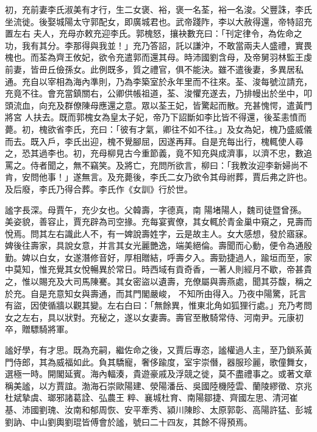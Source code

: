 \begin{pinyinscope}
 初，充前妻李氏淑美有才行，生二女褒、裕，褒一名荃，裕一名浚。父豐誅，李氏坐流徙。後娶城陽太守郭配女，即廣城君也。武帝踐阼，李以大赦得還，帝特詔充置左右
 夫人，充母亦敕充迎李氏。郭槐怒，攘袂數充曰：「刊定律令，為佐命之功，我有其分。李那得與我並！」充乃答詔，託以謙沖，不敢當兩夫人盛禮，實畏槐也。而荃為齊王攸妃，欲令充遣郭而還其母。時沛國劉含母，及帝舅羽林監王虔前妻，皆毌丘儉孫女。此例既多，質之禮官，俱不能決。雖不遣後妻，多異居私通。充自以宰相為海內準則，乃為李築室於永年里而不往來。荃、浚每號泣請充，充竟不往。會充當鎮關右，公卿供帳祖道，荃、浚懼充遂去，乃排幔出於坐中，叩頭流血，向充及群僚陳母應還之意。眾以荃王妃，皆驚起而散。充甚愧愕，遣黃門將宮
 人扶去。既而郭槐女為皇太子妃，帝乃下詔斷如李比皆不得還，後荃恚憤而薨。初，槐欲省李氏，充曰：「彼有才氣，卿往不如不往。」及女為妃，槐乃盛威儀而去。既入戶，李氏出迎，槐不覺腳屈，因遂再拜。自是充每出行，槐輒使人尋之，恐其過李也。初，充母柳見古今重節義，竟不知充與成濟事，以濟不忠，數追罵之。侍者聞之，無不竊笑。及將亡，充問所欲言，柳曰：「我教汝迎李新婦尚不肯，安問他事！」遂無言。及充薨後，李氏二女乃欲令其母祔葬，賈后弗之許也。及后廢，李氏乃得合葬。李氏作《女訓》行於世。



 謐字長深。母賈午，充少女也。父韓壽，字德真，南
 陽堵陽人，魏司徒暨曾孫。美姿貌，善容止，賈充辟為司空掾。充每宴賓僚，其女輒於青金巢中窺之，見壽而悅焉。問其左右識此人不，有一婢說壽姓字，云是故主人。女大感想，發於寤寐。婢後往壽家，具說女意，并言其女光麗艷逸，端美絕倫。壽聞而心動，便令為通殷勤。婢以白女，女遂潛修音好，厚相贈結，呼壽夕入。壽勁捷過人，踰垣而至，家中莫知，惟充覺其女悅暢異於常日。時西域有貢奇香，一著人則經月不歇，帝甚貴之，惟以賜充及大司馬陳騫。其女密盜以遺壽，充僚屬與壽燕處，聞其芬馥，稱之於充。自是充意知女與壽通，而其門閣嚴峻，
 不知所由得入。乃夜中陽驚，託言有盜，因使循牆以觀其變。左右白曰：「無餘異，惟東北角如狐狸行處。」充乃考問女之左右，具以狀對。充秘之，遂以女妻壽。壽官至散騎常侍、河南尹。元康初卒，贈驃騎將軍。



 謐好學，有才思。既為充嗣，繼佐命之後，又賈后專恣，謐權過人主，至乃鎖系黃門侍郎，其為威福如此。負其驕寵，奢侈踰度，室宇崇僭，器服珍麗，歌僮舞女，選極一時。開閣延賓。海內輻湊，貴遊豪戚及浮競之徙，莫不盡禮事之。或著文章稱美謐，以方賈誼。渤海石崇歐陽建、滎陽潘岳、吳國陸機陸雲、蘭陵繆徵、京兆杜斌摯虞、瑯邪諸葛詮、弘農王
 粹、襄城杜育、南陽鄒捷、齊國左思、清河崔基、沛國劉瑰、汝南和郁周恢、安平牽秀、潁川陳眕、太原郭彰、高陽許猛、彭城劉訥、中山劉輿劉琨皆傅會於謐，號曰二十四友，其餘不得預焉。




\end{pinyinscope}
